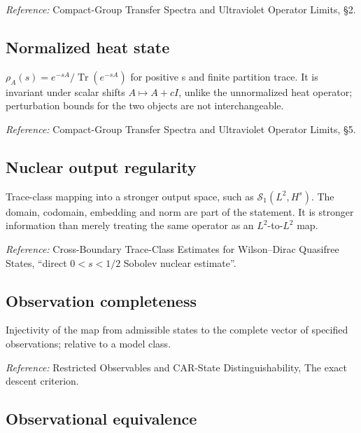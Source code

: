 \documentclass[
  10pt,
  a4paper,
]{article}
\begin{document}
\nopagebreak[4]

\emph{Reference:} Compact-Group Transfer Spectra and Ultraviolet Operator Limits, §2.

\subsection{Normalized heat state}\label{normalized-heat-state}

\(\rho_A(s)=e^{-sA}/\operatorname{Tr}(e^{-sA})\) for positive s and finite partition trace. It is invariant under scalar shifts \(A\mapsto A+cI\), unlike the unnormalized heat operator; perturbation bounds for the two objects are not interchangeable.

\nopagebreak[4]

\emph{Reference:} Compact-Group Transfer Spectra and Ultraviolet Operator Limits, §5.

\subsection{Nuclear output regularity}\label{nuclear-output-regularity}

Trace-class mapping into a stronger output space, such as \(\mathcal S_1(L^2,H^s)\). The domain, codomain, embedding and norm are part of the statement. It is stronger information than merely treating the same operator as an \(L^2\)-to-\(L^2\) map.

\nopagebreak[4]

\emph{Reference:} Cross-Boundary Trace-Class Estimates for Wilson--Dirac Quasifree States, ``direct \(0<s<1/2\) Sobolev nuclear estimate''.

\subsection{Observation completeness}\label{observation-completeness}

Injectivity of the map from admissible states to the complete vector of specified observations; relative to a model class.

\nopagebreak[4]

\emph{Reference:} Restricted Observables and CAR-State Distinguishability, The exact descent criterion.

\subsection{Observational equivalence}\label{observational-equivalence}
\end{document}
